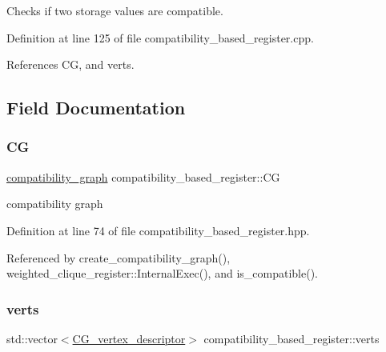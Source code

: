 Checks if two storage values are compatible. 



Definition at line 125 of file compatibility\+\_\+based\+\_\+register.\+cpp.



References CG, and verts.



\subsection{Field Documentation}
\mbox{\label{classcompatibility__based__register_afeb1557ddc05b2c590799373a22dbd82}} 
\subsubsection{\texorpdfstring{CG}{CG}}
{\footnotesize\ttfamily \hyperlink{classcompatibility__based__register_a8d196f6310dd913b6b53ffbbbd7e76d8}{compatibility\+\_\+graph} compatibility\+\_\+based\+\_\+register\+::\+CG\hspace{0.3cm}{\ttfamily [protected]}}



compatibility graph 



Definition at line 74 of file compatibility\+\_\+based\+\_\+register.\+hpp.



Referenced by create\+\_\+compatibility\+\_\+graph(), weighted\+\_\+clique\+\_\+register\+::\+Internal\+Exec(), and is\+\_\+compatible().

\mbox{\label{classcompatibility__based__register_a97287449fdce0d9822269c5f2ba444e4}} 
\subsubsection{\texorpdfstring{verts}{verts}}
{\footnotesize\ttfamily std\+::vector$<$\hyperlink{classcompatibility__based__register_aed04e2ea7e7883f7874e088d875f5679}{C\+G\+\_\+vertex\+\_\+descriptor}$>$ compatibility\+\_\+based\+\_\+register\+::verts\hspace{0.3cm}{\ttfamily [protected]}}




